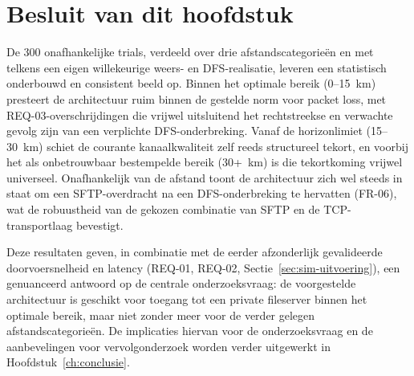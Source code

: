 \section{Besluit van dit hoofdstuk}%
\label{sec:res-besluit}

De 300 onafhankelijke trials, verdeeld over drie afstandscategorieën en met telkens een
eigen willekeurige weers- en DFS-realisatie, leveren een statistisch onderbouwd en
consistent beeld op. Binnen het optimale bereik (0--15~km) presteert de architectuur
ruim binnen de gestelde norm voor packet loss, met REQ-03-overschrijdingen die vrijwel
uitsluitend het rechtstreekse en verwachte gevolg zijn van een verplichte
DFS-onderbreking. Vanaf de horizonlimiet (15--30~km) schiet de courante kanaalkwaliteit
zelf reeds structureel tekort, en voorbij het als onbetrouwbaar bestempelde bereik
(30+~km) is die tekortkoming vrijwel universeel. Onafhankelijk van de afstand toont de
architectuur zich wel steeds in staat om een SFTP-overdracht na een DFS-onderbreking te
hervatten (FR-06), wat de robuustheid van de gekozen combinatie van SFTP en de
TCP-transportlaag bevestigt.

Deze resultaten geven, in combinatie met de eerder afzonderlijk gevalideerde
doorvoersnelheid en latency (REQ-01, REQ-02, Sectie~\ref{sec:sim-uitvoering}), een
genuanceerd antwoord op de centrale onderzoeksvraag: de voorgestelde architectuur is
geschikt voor toegang tot een private fileserver binnen het optimale bereik, maar niet
zonder meer voor de verder gelegen afstandscategorieën. De implicaties hiervan voor de
onderzoeksvraag en de aanbevelingen voor vervolgonderzoek worden verder uitgewerkt in
Hoofdstuk~\ref{ch:conclusie}.